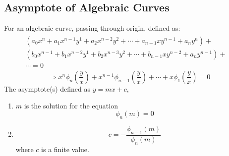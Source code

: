 \subsection{Asymptote of Algebraic Curves}
For an algebraic curve, passing through origin, defined as:
\begin{equation}
	\begin{aligned}
		\begin{split}
			(a_0x^n+a_1x^{n-1}y^1+a_2x^{n-2}y^2+\cdots+a_{n-1}xy^{n-1}+a_n y^n)+&\\
			(b_0x^{n-1}+b_1x^{n-2}y^1+b_2x^{n-3}y^2+\cdots+b_{n-1}xy^{n-2}+a_n y^{n-1})+&\\
			\cdots=0\nonumber
		\end{split}
	\end{aligned}
\end{equation}
\begin{equation}
	\Rightarrow x^n\phi_n\left(\dfrac{y}{x}\right)+x^{n-1}\phi_{n-1}\left(\dfrac{y}{x}\right)+\cdots+x\phi_1\left(\dfrac{y}{x}\right)=0\nonumber
\end{equation}
The asymptote(s) defined as $y=mx+c$,
\begin{enumerate}
	\item $m$ is the solution for the equation
	\begin{equation}
		\phi_n(m)=0
	\end{equation}
	\item \begin{equation}
		c=-\dfrac{\phi_{n-1}(m)}{\phi_n (m)}
	\end{equation}
	where $c$ is a finite value.
\end{enumerate}
